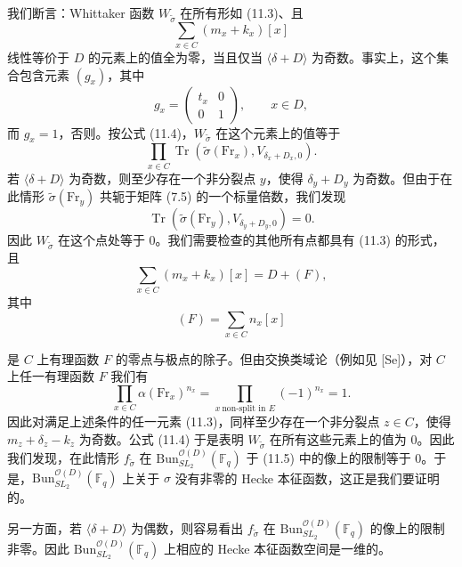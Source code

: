 \documentclass[11pt,a4paper]{article}
\newcommand{\Bun}{\mathrm{Bun}}
\newcommand{\Tr}{\operatorname{Tr}}
\begin{document}
我们断言：Whittaker 函数 $W_{\tilde\sigma}$ 在所有形如 (11.3)、且
\[
\sum_{x\in C}(m_x+k_x)[x]
\]
线性等价于 $D$ 的元素上的值全为零，当且仅当 $\langle\delta+D\rangle$ 为奇数。事实上，这个集合包含元素 $(g_x)$，其中
\[
g_x=\begin{pmatrix}t_x&0\\ 0&1\end{pmatrix},\qquad x\in D,
\]
而 $g_x=1$，否则。按公式 (11.4)，$W_{\tilde\sigma}$ 在这个元素上的值等于
\[
\prod_{x\in C}\Tr(\tilde\sigma(\mathrm{Fr}_x),V_{\delta_x+D_x,0}).
\]
若 $\langle\delta+D\rangle$ 为奇数，则至少存在一个非分裂点 $y$，使得 $\delta_y+D_y$ 为奇数。但由于在此情形 $\tilde\sigma(\mathrm{Fr}_y)$ 共轭于矩阵 (7.5) 的一个标量倍数，我们发现
\[
\Tr(\tilde\sigma(\mathrm{Fr}_y),V_{\delta_y+D_y,0})=0.
\]
因此 $W_{\tilde\sigma}$ 在这个点处等于 0。我们需要检查的其他所有点都具有 (11.3) 的形式，且
\[
\sum_{x\in C}(m_x+k_x)[x]=D+(F),
\]
其中
\[
(F)=\sum_{x\in C}n_x[x]
\]


是 $C$ 上有理函数 $F$ 的零点与极点的除子。但由交换类域论（例如见 [Se]），对 $C$ 上任一有理函数 $F$ 我们有
\begin{equation}\tag{11.6}
\prod_{x\in C}\alpha(\mathrm{Fr}_x)^{n_x}=\prod_{x\ \text{non-split in }E}(-1)^{n_x}=1.
\end{equation}
因此对满足上述条件的任一元素 (11.3)，同样至少存在一个非分裂点 $z\in C$，使得 $m_z+\delta_z-k_z$ 为奇数。公式 (11.4) 于是表明 $W_{\tilde\sigma}$ 在所有这些元素上的值为 0。因此我们发现，在此情形 $f_{\tilde\sigma}$ 在 $\Bun^{\mathcal{O}(D)}_{SL_2}(\mathbb{F}_q)$ 于 (11.5) 中的像上的限制等于 0。于是，$\Bun^{\mathcal{O}(D)}_{SL_2}(\mathbb{F}_q)$ 上关于 $\sigma$ 没有非零的 Hecke 本征函数，这正是我们要证明的。

另一方面，若 $\langle\delta+D\rangle$ 为偶数，则容易看出 $f_{\tilde\sigma}$ 在 $\Bun^{\mathcal{O}(D)}_{SL_2}(\mathbb{F}_q)$ 的像上的限制非零。因此 $\Bun^{\mathcal{O}(D)}_{SL_2}(\mathbb{F}_q)$ 上相应的 Hecke 本征函数空间是一维的。
\end{document}
